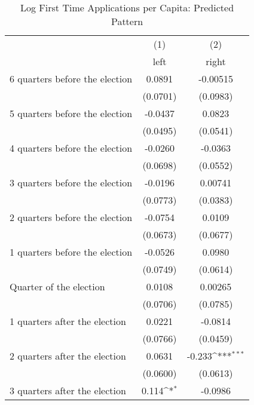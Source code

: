 \begin{table}[htbp]\centering
\def\sym#1{\ifmmode^{#1}\else\(^{#1}\)\fi}
\caption{Log First Time Applications per Capita: Predicted Pattern}
\begin{tabular}{l*{2}{c}}
\hline\hline
                    &\multicolumn{1}{c}{(1)}&\multicolumn{1}{c}{(2)}\\
                    &\multicolumn{1}{c}{left}&\multicolumn{1}{c}{right}\\
\hline
 6 quarters before the election&      0.0891         &    -0.00515         \\
                    &    (0.0701)         &    (0.0983)         \\
[1em]
 5 quarters before the election&     -0.0437         &      0.0823         \\
                    &    (0.0495)         &    (0.0541)         \\
[1em]
 4 quarters before the election&     -0.0260         &     -0.0363         \\
                    &    (0.0698)         &    (0.0552)         \\
[1em]
 3 quarters before the election&     -0.0196         &     0.00741         \\
                    &    (0.0773)         &    (0.0383)         \\
[1em]
 2 quarters before the election&     -0.0754         &      0.0109         \\
                    &    (0.0673)         &    (0.0677)         \\
[1em]
 1 quarters before the election&     -0.0526         &      0.0980         \\
                    &    (0.0749)         &    (0.0614)         \\
[1em]
Quarter of the election&      0.0108         &     0.00265         \\
                    &    (0.0706)         &    (0.0785)         \\
[1em]
 1 quarters after the election&      0.0221         &     -0.0814         \\
                    &    (0.0766)         &    (0.0459)         \\
[1em]
 2 quarters after the election&      0.0631         &      -0.233\sym{***}\\
                    &    (0.0600)         &    (0.0613)         \\
[1em]
 3 quarters after the election&       0.114\sym{*}  &     -0.0986         \\

\end{tabular}
\end{table}
